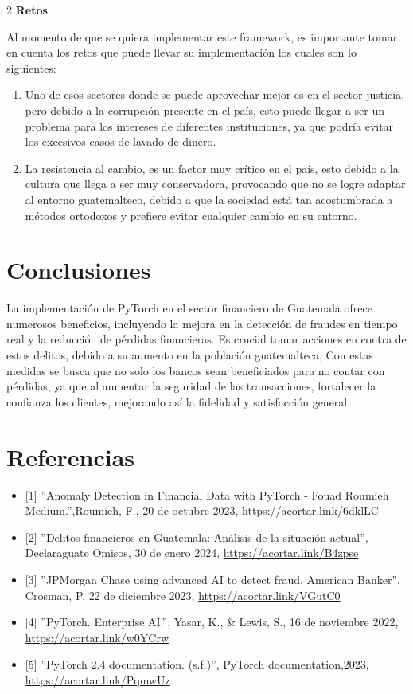 \documentclass[12pt,spanish,Letterpaper,openany]{book}
\begin{document}
\begin {multicols}{2}
\textbf{Retos}

Al momento de que se quiera implementar este framework, es importante tomar en cuenta los retos que puede llevar su implementación los cuales son lo siguientes:

\begin{enumerate}
\def\labelenumi{\arabic{enumi}.}
\item
  Uno de esos sectores donde se puede aprovechar mejor es en el sector justicia, pero debido a la corrupción presente en el país, esto puede llegar a ser un problema para los intereses de diferentes instituciones, ya que podría evitar los excesivos casos de lavado de dinero.
\item
  La resistencia al cambio, es un factor muy crítico en el país, esto debido a la cultura que llega a ser muy conservadora, provocando que no se logre adaptar al entorno guatemalteco, debido a que la sociedad está tan acostumbrada a métodos ortodoxos y prefiere evitar cualquier cambio en su entorno.
\end{enumerate}

\hypertarget{conclusiones-3}{%
\section{Conclusiones}\label{conclusiones-3}}

La implementación de PyTorch en el sector financiero de Guatemala ofrece numerosos beneficios, incluyendo la mejora en la detección de fraudes en tiempo real y la reducción de pérdidas financieras. Es crucial tomar acciones en contra de estos delitos, debido a su aumento en la población guatemalteca, Con estas medidas se busca que no solo los bancos
sean beneficiados para no contar con pérdidas, ya que al aumentar la seguridad de las transacciones, fortalecer la confianza los clientes, mejorando así la fidelidad y satisfacción general.

\hypertarget{referencias-2}{%
\section{Referencias}\label{referencias-2}}

\begin{itemize}
\item
  {[}1{]} ''Anomaly Detection in Financial Data with PyTorch - Fouad Roumieh Medium.'',Roumieh, F., 20 de octubre 2023, \url{https://acortar.link/6dklLC}
\item
  {[}2{]} ''Delitos financieros en Guatemala: Análisis de la situación actual'', Declaraguate Omisos, 30 de enero 2024, \url{https://acortar.link/B4zpse}
\item
  {[}3{]} ''JPMorgan Chase using advanced AI to detect fraud. American Banker'', Crosman, P. 22 de diciembre 2023, \url{https://acortar.link/VGutC0}
\item
  {[}4{]} ''PyTorch. Enterprise AI.'', Yasar, K., \& Lewis, S., 16 de noviembre 2022, \url{https://acortar.link/w0YCrw}
\item
  {[}5{]} ''PyTorch 2.4 documentation. (s.f.)'', PyTorch documentation,2023, \url{https://acortar.link/PqmwUz}
\end{itemize}


\end{multicols}
\end{document}
